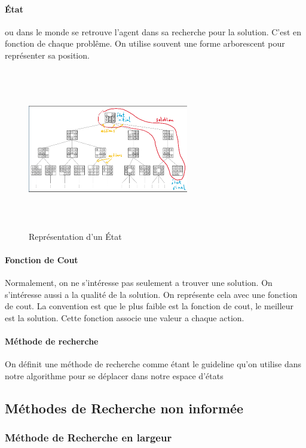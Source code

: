 \documentclass{book}
\begin{document}
\paragraph{État}
ou dans le monde se retrouve l'agent dans sa recherche pour la solution. C'est en fonction de chaque problême. On utilise souvent une forme arborescent pour représenter sa position.
\begin{figure}[!ht]
\centering
\includegraphics[width = 7cm, height = 7cm, keepaspectratio]{Etat.png}
\caption{Représentation d'un État}
\label{fig:etat}
\end{figure}

\paragraph{Fonction de Cout}
Normalement, on ne s'intéresse pas seulement a trouver une solution. On s'intéresse aussi a la qualité de la solution. On représente cela avec une fonction de cout. La convention est que le plus faible est la fonction de cout, le meilleur est la solution. Cette fonction associe une valeur a chaque action.

\paragraph{Méthode de recherche}
On définit une méthode de recherche comme étant le guideline qu'on utilise dans notre algorithme pour se déplacer dans notre espace d'états


\subsection{Méthodes de Recherche non informée}

\subsubsection{Méthode de Recherche en largeur}
\end{document}
